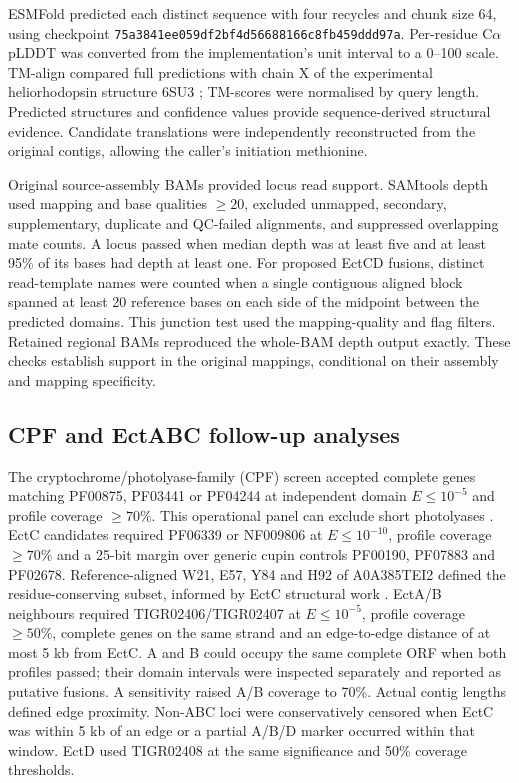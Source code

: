 \documentclass[11pt]{article}
\begin{document}
ESMFold \citep{lin2023esmfold} predicted each distinct sequence with four recycles and chunk size 64, using checkpoint \texttt{75a3841ee059df2bf4d56688166c8fb459ddd97a}. Per-residue C$\alpha$ pLDDT was converted from the implementation's unit interval to a 0--100 scale. TM-align \citep{zhang2005tmalign} compared full predictions with chain X of the experimental heliorhodopsin structure 6SU3 \citep{kovalev2020heliorhodopsin}; TM-scores were normalised by query length. Predicted structures and confidence values provide sequence-derived structural evidence. Candidate translations were independently reconstructed from the original contigs, allowing the caller's initiation methionine.

Original source-assembly BAMs provided locus read support. SAMtools depth used mapping and base qualities $\geq20$, excluded unmapped, secondary, supplementary, duplicate and QC-failed alignments, and suppressed overlapping mate counts. A locus passed when median depth was at least five and at least 95\% of its bases had depth at least one. For proposed EctCD fusions, distinct read-template names were counted when a single contiguous aligned block spanned at least 20 reference bases on each side of the midpoint between the predicted domains. This junction test used the mapping-quality and flag filters. Retained regional BAMs reproduced the whole-BAM depth output exactly. These checks establish support in the original mappings, conditional on their assembly and mapping specificity.

\subsection*{CPF and EctABC follow-up analyses}
The cryptochrome/photolyase-family (CPF) screen accepted complete genes matching PF00875, PF03441 or PF04244 at independent domain $E\leq10^{-5}$ and profile coverage $\geq70\%$. This operational panel can exclude short photolyases \citep{xu2021shortphotolyases}. EctC candidates required PF06339 or NF009806 at $E\leq10^{-10}$, profile coverage $\geq70\%$ and a 25-bit margin over generic cupin controls PF00190, PF07883 and PF02678. Reference-aligned W21, E57, Y84 and H92 of A0A385TEI2 defined the residue-conserving subset, informed by EctC structural work \citep{czech2019ectc}. EctA/B neighbours required TIGR02406/TIGR02407 at $E\leq10^{-5}$, profile coverage $\geq50\%$, complete genes on the same strand and an edge-to-edge distance of at most 5 kb from EctC. A and B could occupy the same complete ORF when both profiles passed; their domain intervals were inspected separately and reported as putative fusions. A sensitivity raised A/B coverage to 70\%. Actual contig lengths defined edge proximity. Non-ABC loci were conservatively censored when EctC was within 5 kb of an edge or a partial A/B/D marker occurred within that window. EctD used TIGR02408 at the same significance and 50\% coverage thresholds.
\end{document}

